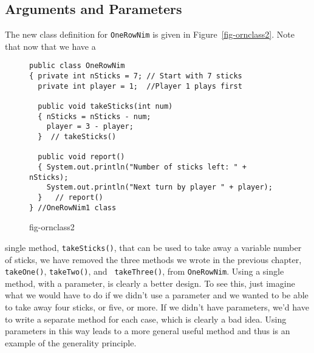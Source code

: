 

\subsection{Arguments and Parameters}

\noindent The new class definition for {\tt OneRowNim} is
given in Figure~\ref{fig-ornclass2}. Note that now that we have a
\begin{figure}[h!]
\jjjprogstart
\begin{jjjlisting}[26.5pc]
\begin{lstlisting}
public class OneRowNim
{ private int nSticks = 7; // Start with 7 sticks
  private int player = 1;  //Player 1 plays first

  public void takeSticks(int num)
  { nSticks = nSticks - num;
    player = 3 - player;
  }  // takeSticks()

  public void report()
  { System.out.println("Number of sticks left: " + nSticks);
    System.out.println("Next turn by player " + player);
  }   // report()
} //OneRowNim1 class
\end{lstlisting}
\end{jjjlisting}
{fig-ornclass2}
\end{figure}
single method, {\tt takeSticks()}, that can be used to take away a
variable number of sticks, we have removed the three methods we wrote
in the previous chapter, {\tt takeOne()}, {\tt takeTwo()}, and {\tt
takeThree()}, from {\tt OneRowNim}.  Using a single method, with a
parameter, is clearly a better design.  To see this, just imagine what
we would have to do if we didn't use a parameter and we wanted to be
able to take away four sticks, or five, or more. If we didn't have
parameters, we'd have to write a separate method for each case, which
is clearly a bad idea. Using parameters in this way leads to a more
general useful method and thus is an example of the generality
principle.


